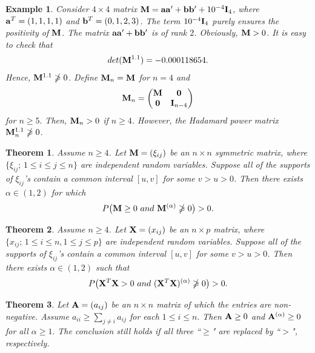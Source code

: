 \documentclass[conference,letterpaper]{IEEEtran}
\numberwithin{equation}{section}
\newcommand{\lbl}{\label}
\newcommand{\bd}{\bold}
\newcommand{\beaa}{\begin{eqnarray*}}
\newcommand{\eeaa}{\end{eqnarray*}}
\newtheorem{theorem}{{\sc Theorem}}[section]
\newtheorem{example}{{\sc Example}}[section]
\begin{document}
\begin{example}\lbl{good_example} Consider $4\times 4$ matrix  $\bd{M}=\bd{a}\bd{a}'+\bd{b}\bd{b}' + 10^{-4}\bd{I}_4$, where $\bd{a}^T=(1,1,1,1)$ and $\bd{b}^T=(0,1,2,3)$. The term $10^{-4}\bd{I}_4$ purely ensures the positivity of $\bd{M}$. The matrix $\bd{a}\bd{a}'+\bd{b}\bd{b}'$  is of rank $2$. Obviously, $\bd{M}>0$. It is easy to check that
\beaa
\mbox{det}(\bd{M}^{1.1})=-0.000118654.
\eeaa
Hence, $\bd{M}^{1.1}\ngeqslant 0$.
Define $\bd{M}_n=\bd{M}$ for $n=4$ and
\beaa
\bd{M}_n=
\begin{pmatrix}
\bd{M} & \bd{0}\\
\bd{0} & \bd{I}_{n-4}
\end{pmatrix}
\eeaa
for $n\geq 5.$
Then, $\bd{M}_n>0$ if $n\geq 4$. However, the Hadamard power matrix $\bd{M}_n^{1.1}\ngeqslant 0$.
\end{example}

\begin{theorem}\lbl{milk} Assume $n\geq 4$.   Let $\bd{M}=(\xi_{ij})$ be an $n\times n$ symmetric matrix, where $\{\xi_{ij};\, 1\leq i \leq j \leq n\}$ are independent random variables. Suppose all of the supports of $\xi_{ij}$'s contain  a common interval $[u, v]$ for some $v>u>0$. Then there exists $\alpha \in (1, 2)$ for which
\beaa
P\big(\bd{M}\geq 0\ \mbox{and}\ \bd{M}^{(\alpha)} \ngeqslant 0\big)>0.
\eeaa
\end{theorem}

\begin{theorem}\lbl{waffle} Assume $n\geq 4$.   Let $\bd{X}=(x_{ij})$ be an $n\times p$  matrix, where $\{x_{ij};\, 1\leq i \leq n, 1\leq j \leq p\}$ are independent random variables. Suppose all of the supports of $\xi_{ij}$'s contain  a common interval $[u, v]$ for some $v>u>0$. Then there exists $\alpha \in (1, 2)$ such that
\beaa
P\big(\bd{X}^T\bd{X}>0\ \mbox{and}\ (\bd{X}^T\bd{X})^{(\alpha)}\ngeqslant 0\big)>0.
\eeaa
\end{theorem}

\begin{theorem}\lbl{my_country} Let $\bd{A}=(a_{ij})$ be an $n\times n$ matrix of which the entries are non-negative. Assume $a_{ii}\geq  \sum_{j\ne i}a_{ij}$ for each $1\leq i\leq n.$ Then $\bd{A} \geq 0$ and $\bd{A}^{(\alpha)}\geq  0$ for all $\alpha\geq 1.$ The conclusion still holds if all three ``$\geq$" are replaced by ``$>$", respectively.
\end{theorem}
\end{document}
